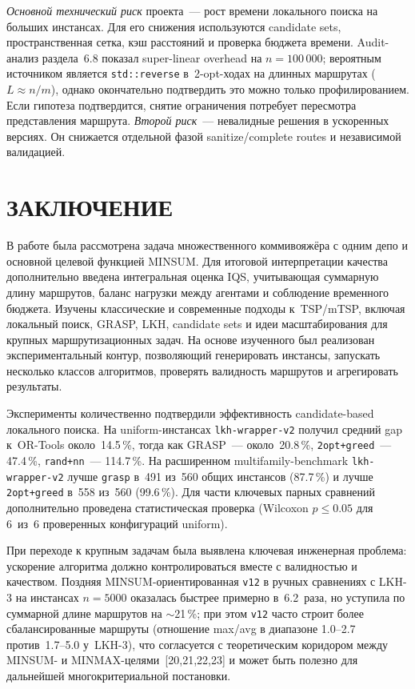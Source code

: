 \documentclass[14pt,a4paper]{extarticle}
\newcommand{\source}[1]{[#1]}
\begin{document}
\textit{Основной технический риск} проекта~--- рост времени локального поиска на больших инстансах. Для его снижения используются candidate sets, пространственная сетка, кэш расстояний и проверка бюджета времени. Audit-анализ раздела~6.8 показал super-linear overhead на $n = 100\,000$; вероятным источником является \texttt{std::reverse} в~2-opt-ходах на длинных маршрутах ($L \approx n/m$), однако окончательно подтвердить это можно только профилированием. Если гипотеза подтвердится, снятие ограничения потребует пересмотра представления маршрута. \textit{Второй риск}~--- невалидные решения в ускоренных версиях. Он снижается отдельной фазой sanitize/complete routes и независимой валидацией.

\section*{ЗАКЛЮЧЕНИЕ}

В работе была рассмотрена задача множественного коммивояжёра с одним депо и основной целевой функцией MINSUM. Для итоговой интерпретации качества дополнительно введена интегральная оценка IQS, учитывающая суммарную длину маршрутов, баланс нагрузки между агентами и соблюдение временного бюджета. Изучены классические и современные подходы к~TSP/mTSP, включая локальный поиск, GRASP, LKH, candidate sets и идеи масштабирования для крупных маршрутизационных задач. На основе изученного был реализован экспериментальный контур, позволяющий генерировать инстансы, запускать несколько классов алгоритмов, проверять валидность маршрутов и агрегировать результаты.

Эксперименты количественно подтвердили эффективность candidate-based локального поиска. На uniform-инстансах \texttt{lkh-wrapper-v2} получил средний gap к~OR-Tools около~14.5\,\%, тогда как GRASP~--- около~20.8\,\%, \texttt{2opt+greed}~--- 47.4\,\%, \texttt{rand+nn}~--- 114.7\,\%. На расширенном multifamily-benchmark \texttt{lkh-wrapper-v2} лучше \texttt{grasp} в~491 из~560 общих инстансов (87.7\,\%) и лучше \texttt{2opt+greed} в~558 из~560 (99.6\,\%). Для части ключевых парных сравнений дополнительно проведена статистическая проверка (Wilcoxon $p \leq 0.05$ для 6~из~6 проверенных конфигураций uniform).

При переходе к крупным задачам была выявлена ключевая инженерная проблема: ускорение алгоритма должно контролироваться вместе с валидностью и качеством. Поздняя MINSUM-ориентированная \texttt{v12} в ручных сравнениях с LKH-3 на инстансах $n=5000$ оказалась быстрее примерно в~6.2~раза, но уступила по суммарной длине маршрутов на $\sim$21\,\%; при этом \texttt{v12} часто строит более сбалансированные маршруты (отношение max/avg в диапазоне 1.0--2.7 против~1.7--5.0 у~LKH-3), что согласуется с теоретическим коридором между MINSUM- и MINMAX-целями~\source{20,21,22,23} и может быть полезно для дальнейшей многокритериальной постановки.
\end{document}
